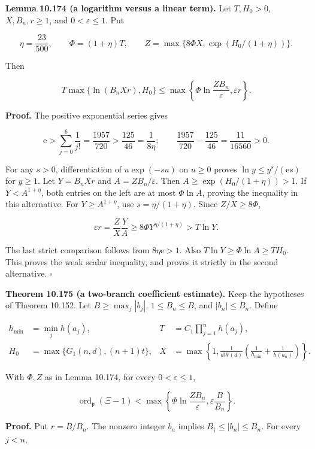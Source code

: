 \documentclass[
  11pt,
  a4paper,
]{article}
\begin{document}
\textbf{Lemma 10.174 (a logarithm versus a linear term).} Let
\(T,H_0>0\), \(X,B_n,r\ge1\), and \(0<\varepsilon\le1\). Put

\[
\eta=\frac{23}{500},\qquad \Phi=(1+\eta)T,
\qquad Z=\max\{8\Phi X,\exp(H_0/(1+\eta))\}.
\tag{10.649}
\]

Then

\[
T\max\{\ln(B_nXr),H_0\}
\le\max\left\{\Phi\ln\frac{ZB_n}{\varepsilon},
                        \varepsilon r\right\}.
\tag{10.650}
\]

\textbf{Proof.} The positive exponential series gives

\[
\mathrm e>\sum_{j=0}^6\frac1{j!}=\frac{1957}{720}
>\frac{125}{46}=\frac1{8\eta};
\qquad \frac{1957}{720}-\frac{125}{46}=\frac{11}{16560}>0.
\tag{10.651}
\]

For any \(s>0\), differentiation of \(u\exp(-su)\) on \(u\ge0\) proves
\(\ln y\le y^s/(\mathrm e s)\) for \(y\ge1\). Let \(Y=B_nXr\) and
\(A=ZB_n/\varepsilon\). Then \(A\ge\exp(H_0/(1+\eta))>1\). If
\(Y<A^{1+\eta}\), both entries on the left are at most \(\Phi\ln A\),
proving the inequality in this alternative. For \(Y\ge A^{1+\eta}\), use
\(s=\eta/(1+\eta)\). Since \(Z/X\ge8\Phi\),

\[
\varepsilon r=\frac Z X\frac Y A
\ge8\Phi Y^{\eta/(1+\eta)}
>T\ln Y.
\tag{10.652}
\]

The last strict comparison follows from \(8\eta\mathrm e>1\). Also
\(T\ln Y\ge\Phi\ln A\ge T H_0\). This proves the weak scalar inequality,
and proves it strictly in the second alternative. \(\square\)

\textbf{Theorem 10.175 (a two-branch coefficient estimate).} Keep the
hypotheses of Theorem 10.152. Let \(B\ge\max_j|b_j|\),
\(1\le B_n\le B\), and \(|b_n|\le B_n\). Define

\[
\begin{aligned}
h_{\min}&=\min_jh(a_j),&
T&=C_1\prod_{j=1}^nh(a_j),\\
H_0&=\max\{G_1(n,d),(n+1)t\},&
X&=\max\left\{1,\frac1{dW(d)}
            \left(\frac1{h_{\min}}+\frac1{h(a_n)}\right)\right\}.
\end{aligned}
\tag{10.653}
\]

With \(\Phi,Z\) as in Lemma 10.174, for every \(0<\varepsilon\le1\),

\[
\operatorname{ord}_{\mathfrak p}(\Xi-1)
<\max\left\{\Phi\ln\frac{ZB_n}{\varepsilon},
                         \varepsilon\frac B{B_n}\right\}.
\tag{10.654}
\]

\textbf{Proof.} Put \(r=B/B_n\). The nonzero integer \(b_n\) implies
\(B_\dagger\le |b_n|\le B_n\). For every \(j<n\),
\end{document}

